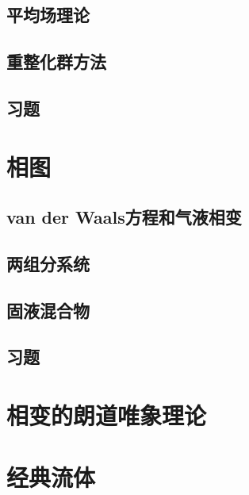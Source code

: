 \documentclass[AutoFakeBold]{tstextbook}
\begin{document}
\section{平均场理论} %
\label{sec:平均场理论}

\section{重整化群方法} %
\label{sec:重整化群方法}

\section{习题} %
\label{sec:习题11}

\chapter{相图} %
\label{cha:相图}
\section{van der Waals方程和气液相变} %
\label{sec:van der Waals方程和气液相变}

\section{两组分系统} %
\label{sec:两组分系统}

\section{固液混合物} %
\label{sec:固液混合物}

\section{习题} %
\label{sec:习题12}

\chapter{相变的朗道唯象理论} %
\label{cha:相变的朗道唯象理论}

\chapter{经典流体} %
\label{cha:经典流体}
\end{document}
